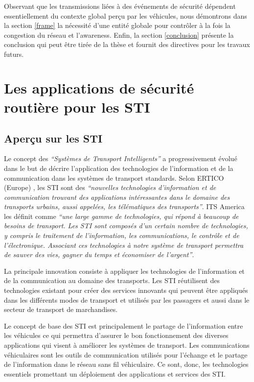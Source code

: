 Observant que les transmissions liées à des événements de sécurité dépendent essentiellement du contexte global perçu par les véhicules, nous démontrons dans la section \ref{frame} la nécessité d'une entité globale pour contrôler à la fois la congestion du réseau et l'awareness. Enfin, la section \ref{conclusion} présente la conclusion qui peut être tirée de la thèse et fournit des directives pour les travaux futurs.


\section{Les applications de sécurité routière pour les STI\label{state}}

\subsection{Aperçu sur les STI}
Le concept des \textit {``Systèmes de Transport Intelligents''} a progressivement évolué dans le but de décrire l'application des technologies de l'information et de la communication dans les systèmes de transport standards.
Selon ERTICO (Europe) \cite {ertico}, les STI sont des \textit {``nouvelles technologies d'information et de communication trouvant des applications intéressantes dans le domaine des transports urbains, aussi appelées, les télématiques des transports''}. ITS America \cite{itsAmerica} les définit comme \textit{``une large gamme de technologies, qui répond à beaucoup de besoins de transport. Les STI sont composés d'un certain nombre de technologies, y compris le traitement de l'information, les communications, le contrôle et de l'électronique. Associant ces technologies à notre système de transport permettra de sauver des vies, gagner du temps et économiser de l'argent''}.

La principale innovation consiste à appliquer les technologies de l'information et de la communication au domaine des transports. Les STI réutilisent des technologies existant pour créer des services innovants qui peuvent être appliqués dans les différents modes de transport et utilisés par les passagers et aussi dans le secteur de transport de marchandises.

Le concept de base des STI est principalement le partage de l'information entre les véhicules ce qui permettra d'assurer le bon fonctionnement des diverses applications qui visent à améliorer les systèmes de transport. Les communications véhiculaires sont les outils de communication utilisés pour l'échange et le partage de l'information dans le réseau sans fil véhiculaire. Ce sont, donc, les technologies essentiels promettant un déploiement des applications et services des STI.

